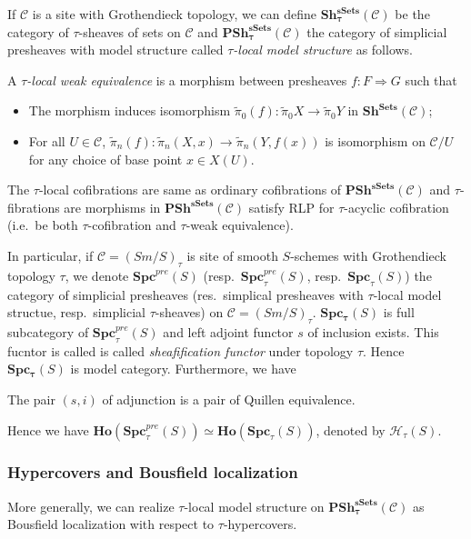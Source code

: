 \documentclass[b5paper,11pt]{article}
\begin{document}
If $\mathcal{C}$ is a site with Grothendieck topology, we can define $\mathbf{Sh^{sSets}_\tau} (\mathcal{C})$ be the category of $\tau$-sheaves of sets on $\mathcal{C}$ and $\mathbf{PSh_\tau^{sSets}}(\mathcal{C})$ the category of simplicial presheaves with model structure called \emph{$\tau$-local model structure} as follows. 
\begin{secdefn}
	A \emph{$\tau$-local weak equivalence} is a morphism between presheaves $f \colon F \Rightarrow G$ such that
	\begin{itemize}
		\item The morphism induces isomorphism $\tilde{\pi}_0(f): \tilde{\pi}_0X \to \tilde{\pi}_0Y$ in $\mathbf{Sh^{Sets}}(\mathcal{C})$;
		\item For all $U \in \mathcal{C}$, $\tilde{\pi}_n(f): \tilde{\pi}_n(X,x) \to \tilde{\pi}_n(Y,f(x))$ is isomorphism on $\mathcal{C}/U$ for any choice of base point $x \in X(U)$.
	\end{itemize}
\end{secdefn}
The $\tau$-local cofibrations are same as ordinary cofibrations of $\mathbf{PSh^{sSets}}(\mathcal{C})$ and $\tau$-fibrations are morphisms in $\mathbf{PSh^{sSets}}(\mathcal{C})$ satisfy RLP for $\tau$-acyclic cofibration (i.e.\ be both $\tau$-cofibration and $\tau$-weak equivalence).

In particular, if $\mathcal{C}=(Sm/S)_\tau$ is site of smooth $S$-schemes with Grothendieck topology $\tau$, we denote $\mathbf{Spc}^{pre}(S)$ (resp.\ $\mathbf{Spc}_\tau^{pre}(S)$, resp.\ $\mathbf{Spc}_\tau(S)$) the category of simplicial presheaves (res.\ simplical presheaves with $\tau$-local model structue, resp.\ simplicial $\tau$-sheaves) on $\mathcal{C}=(Sm/S)_\tau$. $\mathbf{Spc_\tau}(S)$ is full subcategory of $\mathbf{Spc}^{pre}_\tau(S)$ and left adjoint functor $s$ of inclusion exists. This fucntor is called is called \emph{sheafification functor} under topology $\tau$. Hence $\mathbf{Spc_\tau}(S)$ is model category. Furthermore, we have 
\begin{secprop}
	The pair $(s ,i)$ of adjunction is a pair of Quillen equivalence.
\end{secprop}
Hence we have $\mathbf{Ho}(\mathbf{Spc}_\tau^{pre}(S)) \simeq \mathbf{Ho}(\mathbf{Spc}_\tau(S))$, denoted by $\mathcal{H}_\tau(S)$.
\subsubsection{Hypercovers and Bousfield localization}
More generally, we can realize $\tau$-local model structure on $\mathbf{PSh^{sSets}_\tau}(\mathcal{C})$ as Bousfield localization with respect to $\tau$-hypercovers.
\begin{secdefn}
	
\end{secdefn} 
\end{document}
